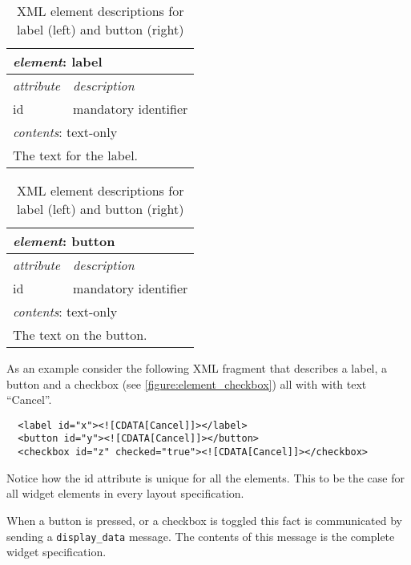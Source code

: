 \documentclass{article}
\newcommand{\msg}[1]{\texttt{#1}}
\begin{document}
    \begin{table}[H]
     \begin{center}
     \begin{tabular}{|l|l|}
       \hline
        \multicolumn{2}{|l|}{\textit{element}: label} \\
       \hline \hline
        \textit{attribute} & \textit{description} \\
       \hline
        id                 & mandatory identifier \\
       \hline \hline
        \multicolumn{2}{|l|}{\textit{contents}: text-only} \\
       \hline
         \multicolumn{2}{|l|}{The text for the label.} \\
       \hline
     \end{tabular}
     \begin{tabular}{|l|l|}
       \hline
        \multicolumn{2}{|l|}{\textit{element}: button} \\
       \hline \hline
        \textit{attribute} & \textit{description} \\
       \hline
        id                 & mandatory identifier \\
       \hline \hline
        \multicolumn{2}{|l|}{\textit{contents}: text-only} \\
       \hline
         \multicolumn{2}{|l|}{The text on the button.} \\
       \hline
     \end{tabular}
     \end{center}
     \caption{XML element descriptions for label (left) and button (right)}
    \end{table}

    \noindent As an example consider the following XML fragment that describes
    a label, a button and a checkbox (see \ref{figure:element_checkbox}) all
    with with text ``Cancel''.
    \small \begin{verbatim}
  <label id="x"><![CDATA[Cancel]]></label>
  <button id="y"><![CDATA[Cancel]]></button>
  <checkbox id="z" checked="true"><![CDATA[Cancel]]></checkbox>\end{verbatim}
  \normalsize
    Notice how the id attribute is unique for all the elements. This to
    be the case for all widget elements in every layout specification.

    \noindent When a button is pressed, or a checkbox is toggled this fact is
    communicated by sending a \msg{display\_data} message. The contents of this
    message is the complete widget specification.
\end{document}
